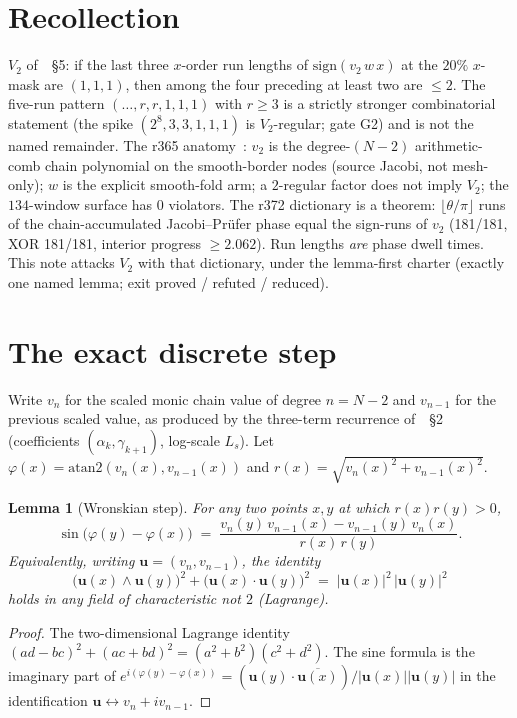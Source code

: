 \documentclass[11pt]{article}
\newtheorem{lemma}{Lemma}
\theoremstyle{remark}
\begin{document}
\section{Recollection}\label{sec:rec}

$V_2$ of~\cite{xn}~\S5: if the last three $x$-order run lengths
of $\mathrm{sign}(v_2\,w\,x)$ at the $20\%$ $x$-mask are
$(1,1,1)$, then among the four preceding at least two are
$\le 2$.  The five-run pattern $(\ldots,r,r,1,1,1)$ with
$r\ge 3$ is a strictly stronger combinatorial statement (the
spike $(2^{8},3,3,1,1,1)$ is $V_2$-regular; gate G2) and is
not the named remainder.  The r365 anatomy~\cite{v2}: $v_2$ is the
degree-$(N-2)$ arithmetic-comb chain polynomial on the
smooth-border nodes (source Jacobi, not mesh-only); $w$ is the
explicit smooth-fold arm; a $2$-regular factor does not imply
$V_2$; the $134$-window surface has $0$ violators.  The r372
dictionary is a theorem: $\lfloor\theta/\pi\rfloor$ runs of the
chain-accumulated Jacobi--Pr\"ufer phase equal the sign-runs of
$v_2$ (181/181, XOR 181/181, interior progress $\ge 2.062$).
Run lengths \emph{are} phase dwell times.  This note attacks
$V_2$ with that dictionary, under the lemma-first charter
(exactly one named lemma; exit proved / refuted / reduced).

\section{The exact discrete step}\label{sec:step}

Write $v_n$ for the scaled monic chain value of degree $n=N-2$
and $v_{n-1}$ for the previous scaled value, as produced by the
three-term recurrence of~\cite{xn}~\S2 (coefficients
$(\hat\alpha_k,\gamma_{k+1})$, log-scale $L_s$).  Let
$\varphi(x)=\mathrm{atan2}(v_n(x),v_{n-1}(x))$ and
$r(x)=\sqrt{v_n(x)^2+v_{n-1}(x)^2}$.

\begin{lemma}[Wronskian step]\label{lem:wronskian}
For any two points $x,y$ at which $r(x)r(y)>0$,
\[
\sin\bigl(\varphi(y)-\varphi(x)\bigr)
 \;=\;
 \frac{v_n(y)\,v_{n-1}(x)-v_{n-1}(y)\,v_n(x)}{r(x)\,r(y)}.
\]
Equivalently, writing $\mathbf{u}=(v_n,v_{n-1})$, the identity
\[
\bigl(\mathbf{u}(x)\wedge\mathbf{u}(y)\bigr)^2
 +
 \bigl(\mathbf{u}(x)\cdot\mathbf{u}(y)\bigr)^2
 \;=\;
 \lvert\mathbf{u}(x)\rvert^2\,\lvert\mathbf{u}(y)\rvert^2
\]
holds in any field of characteristic not $2$ (Lagrange).
\end{lemma}

\begin{proof}
The two-dimensional Lagrange identity
$(a d-b c)^2+(a c+b d)^2=(a^2+b^2)(c^2+d^2)$.  The sine formula
is the imaginary part of
$e^{i(\varphi(y)-\varphi(x))}=
(\mathbf{u}(y)\cdot\overline{\mathbf{u}(x)})/\lvert\mathbf{u}(x)\rvert\lvert\mathbf{u}(y)\rvert$
in the identification $\mathbf{u}\leftrightarrow v_n+i v_{n-1}$.
\end{proof}
\end{document}
